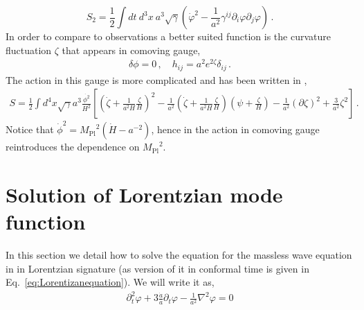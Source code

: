 \documentclass[a4paper,11pt]{article}
\numberwithin{equation}{section}
\newcommand{\mpl}{{M_{\mathrm{Pl}}}}
\numberwithin{equation}{section}
\begin{document}
\begin{equation}
S_2=\frac{1}{2}\int dt\ d^3 x\  a^{3}\sqrt{\gamma}\left(\dot\varphi^2-\frac{1}{a^2}\gamma^{ij}\partial_i\varphi\partial_j\varphi\right) \,.
\end{equation}
In order to compare to observations a better suited function is the curvature fluctuation $\zeta$
that appears in comoving gauge,
\begin{align}
\delta\phi=0 \,, \quad h_{ij}=a^2e^{2\zeta}\delta_{ij} \,.
\end{align}
The action in this gauge is more complicated and has been written in \cite{Handley:2019anl},
\begin{align}
S=\frac{1}{2} \int d^4 x \sqrt{\gamma} a^3\frac{\dot{\phi^2}}{H^2}\left[\left(\dot \zeta+ \frac{1}{a^2H}\frac{\zeta}{H}\right)^2-\frac{1}{a^2}\left(\dot \zeta+ \frac{1}{a^2H}\frac{\zeta}{H}\right)\left(\psi+\frac{\zeta}{H}\right)-\frac{1}{a^2}(\partial\zeta)^2+\frac{3}{a^2}\zeta^2
\right] \,.
\label{eq:actioncomovinggaguge}
\end{align}
Notice that $\dot\phi^2= \mpl^2(\dot H-a^{-2})$, hence in the action in comoving gauge reintroduces the dependence on $\mpl^2$.
\section{Solution of Lorentzian mode function}
\label{sec:solution_eq}
In this section we detail how to solve the equation for the massless wave equation in  in Lorentzian signature (as version of it in conformal time  is given in Eq.~\eqref{eq:Lorentizanequation}). We will write it as,
\begin{align}
\partial_t^2\varphi +3 \frac{\dot a}{a}\partial_t\varphi-\frac{1}{a^2}\nabla^2\varphi=0
\end{align}
\end{document}
